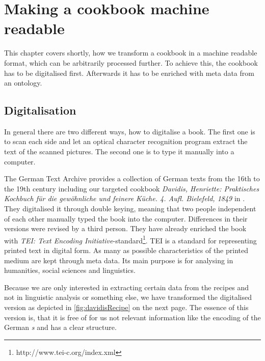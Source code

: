 \documentclass[12pt, twoside]{report}
\newcommand*\longs{{\fontencoding{TS1}\selectfont s}}
\begin{document}
\chapter{Making a cookbook machine readable}
This chapter covers shortly, how we transform a cookbook in a machine readable format, which can be arbitrarily processed further. To achieve this, the cookbook has to be digitalised first. Afterwards it has to be enriched with meta data from an ontology.

\section{Digitalisation}
In general there are two different ways, how to digitalise a book. The first one is to scan each side and let an optical character recognition program extract the text of the scanned pictures. The second one is to type it manually into a computer.

The German Text Archive provides a collection of German texts from the 16th to the 19th century including our targeted cookbook \textit{Davidis, Henriette: Praktisches Kochbuch für die gewöhnliche und feinere Küche. 4. Aufl. Bielefeld, 1849} in \parencite{DTA}. They digitalised it through double keying, meaning that two people independent of each other manually typed the book into the computer. Differences in their versions were revised by a third person. They have already enriched the book with \textit{TEI: Text Encoding Initiative}-standard\footnote{http://www.tei-c.org/index.xml}. TEI is a standard for representing printed text in digital form. As many as possible characteristics of the printed medium are kept through meta data. Its main purpose is for analysing in humanities, social sciences and linguistics.

Because we are only interested in extracting certain data from the recipes and not in linguistic analysis or something else, we have transformed the digitalised version as depicted in \cref{fig:davidisRecipe} on the next page. The essence of this version is, that it is free of for us not relevant information like the encoding of the German \textit{\longs} and has a clear structure. 
\end{document}
